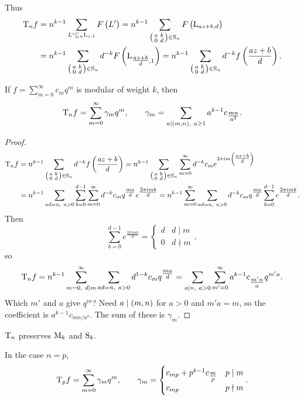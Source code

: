 Thus
\begin{align*}
\T_nf
& = n^{k - 1}\sum_{L' \subseteq_n \L_{z, 1}} F\br{L'}
= n^{k - 1}\sum_{\twobytwosmall{a}{b}{0}{d} \in \S_n} F\br{\L_{az + b, d}} \\
& = n^{k - 1}\sum_{\twobytwosmall{a}{b}{0}{d} \in \S_n} d^{-k}F\br{\L_{\tfrac{az + b}{d}, 1}}
= n^{k - 1}\sum_{\twobytwosmall{a}{b}{0}{d} \in \S_n} d^{-k}f\br{\dfrac{az + b}{d}}.
\end{align*}

\begin{theorem}
If $ f = \sum_{m = 0}^\infty c_mq^m $ is modular of weight $ k $, then
$$ \T_nf = \sum_{m = 0}^\infty \gamma_mq^m, \qquad \gamma_m = \sum_{a \mid \br{m, n}, \ a \ge 1} a^{k - 1}c_{\tfrac{mn}{a^2}}. $$
\end{theorem}

\begin{proof}
\begin{align*}
\T_nf
& = n^{k - 1}\sum_{\twobytwosmall{a}{b}{0}{d} \in \S_n} d^{-k}f\br{\dfrac{az + b}{d}}
= n^{k - 1}\sum_{\twobytwosmall{a}{b}{0}{d} \in \S_n} \sum_{m = 0}^\infty d^{-k}c_me^{2\pi im\br{\tfrac{az + b}{d}}} \\
& = n^{k - 1}\sum_{ad = n, \ a > 0} \sum_{b = 0}^{d - 1} \sum_{m = 0}^\infty d^{-k}c_mq^{\tfrac{ma}{d}}e^{\tfrac{2\pi imb}{d}}
= n^{k - 1}\sum_{m = 0}^\infty \sum_{ad = n, \ a > 0} d^{-k}c_mq^{\tfrac{ma}{d}}\sum_{b = 0}^{d - 1} e^{\tfrac{2\pi imb}{d}}.
\end{align*}
Then
$$ \sum_{b = 0}^{d - 1} e^{\tfrac{2\pi imb}{d}} =
\begin{cases}
d & d \mid m \\
0 & d \nmid m
\end{cases},
$$
so
$$ \T_nf = n^{k - 1}\sum_{m = 0, \ d \mid m}^\infty \sum_{ad = n, \ a > 0} d^{1 - k}c_mq^{\tfrac{ma}{d}} = \sum_{a \mid n, \ a > 0} \sum_{m' = 0}^\infty a^{k - 1}c_{\tfrac{m'n}{a}}q^{m'a}. $$
Which $ m' $ and $ a $ give $ q^m $? Need $ a \mid \br{m, n} $ for $ a > 0 $ and $ m'a = m $, so the coefficient is $ a^{k - 1}c_{mn / a^2} $. The sum of these is $ \gamma_m $.
\end{proof}

\begin{corollary}
$ \T_n $ preserves $ \M_k $ and $ \S_k $.
\end{corollary}

In the case $ n = p $,
$$ \T_pf = \sum_{m = 0}^\infty \gamma_mq^m, \qquad \gamma_m =
\begin{cases}
c_{mp} + p^{k - 1}c_{\tfrac{m}{p}} & p \mid m \\
c_{mp} & p \nmid m
\end{cases}.
$$

